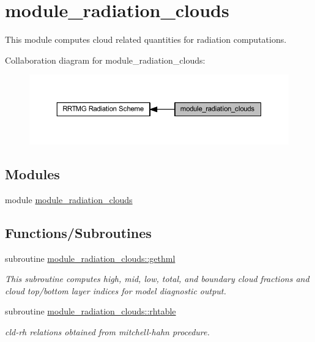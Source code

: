\hypertarget{group__module__radiation__clouds}{}\section{module\+\_\+radiation\+\_\+clouds}
\label{group__module__radiation__clouds}


This module computes cloud related quantities for radiation computations.  


Collaboration diagram for module\+\_\+radiation\+\_\+clouds\+:\nopagebreak
\begin{figure}[H]
\begin{center}
\leavevmode
\includegraphics[width=350pt]{group__module__radiation__clouds}
\end{center}
\end{figure}
\subsection*{Modules}
\begin{DoxyCompactItemize}
\item 
module \hyperlink{namespacemodule__radiation__clouds}{module\+\_\+radiation\+\_\+clouds}
\end{DoxyCompactItemize}
\subsection*{Functions/\+Subroutines}
\begin{DoxyCompactItemize}
\item 
subroutine \hyperlink{group__module__radiation__clouds_gade00b72417f507bb7b07bc58dad58a61}{module\+\_\+radiation\+\_\+clouds\+::gethml}
\begin{DoxyCompactList}\small\item\em This subroutine computes high, mid, low, total, and boundary cloud fractions and cloud top/bottom layer indices for model diagnostic output. \end{DoxyCompactList}\item 
subroutine \hyperlink{group__module__radiation__clouds_gaf2368d9f176e9ab76bd9bd7cd687f491}{module\+\_\+radiation\+\_\+clouds\+::rhtable}
\begin{DoxyCompactList}\small\item\em cld-\/rh relations obtained from mitchell-\/hahn procedure. \end{DoxyCompactList}\end{DoxyCompactItemize}
